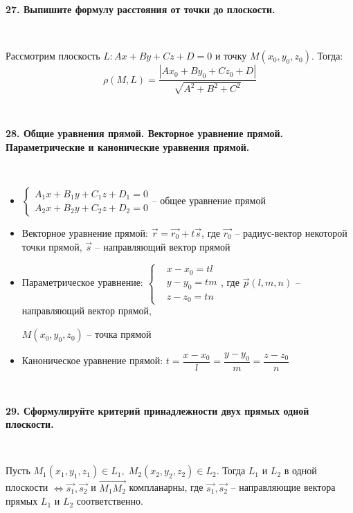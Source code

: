 \documentclass{article}
\begin{document}
	\textbf{27. Выпишите формулу расстояния от точки до плоскости.}
	
	{
		$\;$
		\setlength{\parindent}{0.4cm}
		\hangindent=0.4cm
		
		Рассмотрим плоскость $L:Ax+By+Cz+D=0$ и точку $M(x_0, y_0, z_0)$. Тогда:
		$$\rho(M, L)=\dfrac{|Ax_0+By_0+Cz_0+D|}{\sqrt{A^2+B^2+C^2}}$$
		
		$\;$
		\setlength{\parindent}{0cm}
		\hangindent=0cm
	}
	
	\textbf{28. Общие уравнения прямой. Векторное уравнение прямой. Параметрические и канонические уравнения прямой.}
	
	{
		$\;$
		\setlength{\parindent}{0.4cm}
		\hangindent=0.4cm
		
		\begin{itemize}
		\item $\begin{cases}
		A_1x+B_1y+C_1z+D_1=0\\
		A_2x+B_2y+C_2z+D_2=0
		\end{cases}$-- общее уравнение прямой
		
		\item Векторное уравнение прямой: $\overrightarrow{r}=\overrightarrow{r_0}+t\overrightarrow{s}$, где $\overrightarrow{r_0}$ -- радиус-вектор некоторой точки прямой, $\overrightarrow{s}$ -- направляющий вектор прямой
		
	  	\item Параметрическое уравнение: $\left\lbrace \begin{aligned}
		&x-x_0=tl\\
		&y-y_0=tm\\
		&z-z_0=tn
		\end{aligned}\right. $, где $\overrightarrow{p}(l, m, n)$ -- направляющий вектор прямой, 
		
		$M(x_0, y_0, z_0)$ -- точка прямой
		
		\item Каноническое уравнение прямой: $t=\dfrac{x-x_0}{l}=\dfrac{y-y_0}{m}=\dfrac{z-z_0}{n}$\\
		
		\end{itemize}
		$\;$
		\setlength{\parindent}{0cm}
		\hangindent=0cm
	}
	
	\textbf{29. Сформулируйте критерий принадлежности двух прямых одной плоскости.}
	
	{
		$\;$
		\setlength{\parindent}{0.4cm}
		\hangindent=0.4cm
		
		Пусть $M_1(x_1, y_1, z_1)\in L_1, \; M_2(x_2, y_2, z_2)\in L_2$. Тогда $L_1$ и $L_2$ в одной плоскости $\Leftrightarrow\overrightarrow{s_1}, \overrightarrow{s_2}$ и $\overrightarrow{M_1M_2}$ компланарны, где $\overrightarrow{s_1}, \overrightarrow{s_2}$ -- направляющие вектора прямых $L_1$ и $L_2$ соответственно.
		
		$\;$
		\setlength{\parindent}{0cm}
		\hangindent=0cm
	}
	
\end{document}
